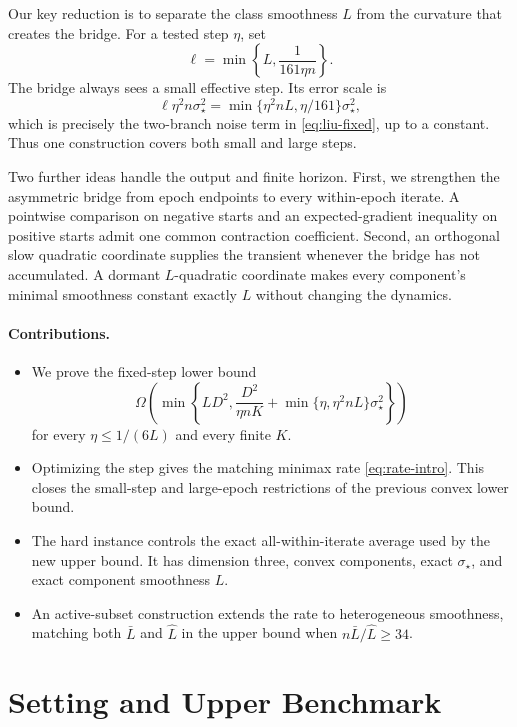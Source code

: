 \documentclass[twoside]{article}
\begin{document}
Our key reduction is to separate the class smoothness $L$ from the curvature that creates the bridge. For a tested step $\eta$, set
\begin{equation}
 \ell=\min\left\{L,\frac{1}{161\eta n}\right\}.
 \label{eq:ell}
\end{equation}
The bridge always sees a small effective step. Its error scale is \[ \ell\eta^2n\sigma_\star^2 =\min\{\eta^2nL,\eta/161\}\sigma_\star^2, \] which is precisely the two-branch noise term in \eqref{eq:liu-fixed}, up to a constant. Thus one construction covers both small and large steps.

Two further ideas handle the output and finite horizon. First, we strengthen the asymmetric bridge from epoch endpoints to every within-epoch iterate. A pointwise comparison on negative starts and an expected-gradient inequality on positive starts admit one common contraction coefficient. Second, an orthogonal slow quadratic coordinate supplies the transient whenever the bridge has not accumulated. A dormant $L$-quadratic coordinate makes every component's minimal smoothness constant exactly $L$ without changing the dynamics.

\paragraph{Contributions.}
\begin{itemize}
\item We prove the fixed-step lower bound
\[ \Omega\!\left( \min\!\left\{LD^2,\frac{D^2}{\eta nK} +\min\{\eta,\eta^2nL\}\sigma_\star^2\right\}\right) \] for every $\eta\le1/(6L)$ and every finite $K$.
\item Optimizing the step gives the matching minimax rate
\eqref{eq:rate-intro}. This closes the small-step and large-epoch restrictions of the previous convex lower bound.
\item The hard instance controls the exact all-within-iterate average used by
the new upper bound. It has dimension three, convex components, exact $\sigma_\star$, and exact component smoothness $L$.
\item An active-subset construction extends the rate to heterogeneous
smoothness, matching both $\bar L$ and $\widehat L$ in the upper bound when $n\bar L/\widehat L\ge34$.
\end{itemize}

\section{Setting and Upper Benchmark}
\label{sec:setting}
\end{document}
